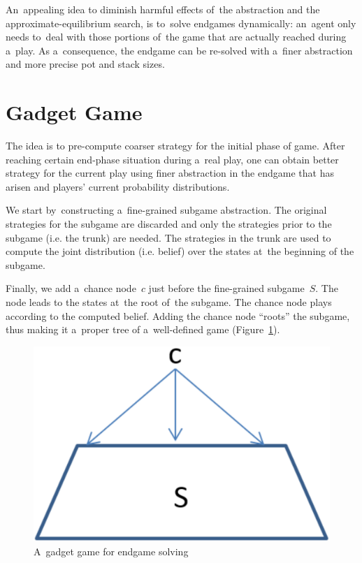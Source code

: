 An~appealing idea to diminish harmful effects of~the abstraction and the approximate-equilibrium search, is to~solve endgames dynamically:
an~agent only needs to~deal with those portions of~the game that are actually reached during a~play.
As a~consequence, the endgame can be re-solved with a~finer abstraction and more precise pot and stack sizes.

\section{Gadget Game}
The idea is to pre-compute coarser strategy for the initial phase of game.
After reaching certain end-phase situation during a~real play, one can obtain better strategy for the current play using finer abstraction in the endgame that has arisen and players' current probability distributions.

We start by~constructing a~fine-grained subgame abstraction.
The original strategies for the subgame are discarded and only the strategies prior to the subgame (i.e. the trunk) are needed.
The strategies in the trunk are used to compute the joint distribution (i.e. belief) over the states at~the beginning of the subgame.

Finally, we add a~chance node~$c$ just before the fine-grained subgame~$S$.
The node leads to the states at~the root of~the subgame.
The chance node plays according to the computed belief.
Adding the chance node ``roots'' the subgame, thus making it a~proper tree of a~well-defined game (Figure~\ref{fig:endgame-solving-gadget}).
\begin{figure}[H]
  \centering
  \includegraphics[width=.3\textwidth]{../img/endgame-solving-gadget.png}
  \caption{A~gadget game for endgame solving}
  \label{fig:endgame-solving-gadget}
\end{figure}

